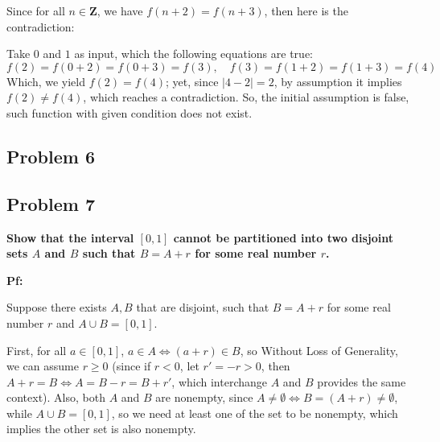 \documentclass{article}
\begin{document}
Since for all $n\in\mathbf{Z}$, we have $f(n+2)=f(n+3)$, then here is the contradiction: 

Take $0$ and $1$ as input, which the following equations are true:
$$f(2)=f(0+2)=f(0+3)=f(3),\quad f(3)=f(1+2)=f(1+3)=f(4)$$
Which, we yield $f(2)=f(4)$; yet, since $|4-2|=2$, by assumption it implies $f(2)\neq f(4)$, which reaches a contradiction. So, the initial assumption is false, such function with given condition does not exist.

\hfill

\subsection{Problem 6}

\hfill

\subsection{Problem 7}
\textbf{Show that the interval $[0, 1]$ cannot be partitioned into two disjoint sets $A$ and $B$ such that $B = A + r$ for some real number $r$.}

\textbf{Pf:}

Suppose there exists $A, B$ that are disjoint, such that $B=A+r$ for some real number $r$ and $A\cup B=[0,1]$.

First, for all $a\in[0,1]$, $a\in A \iff (a+r)\in B$, so Without Loss of Generality, we can assume $r \geq 0$ (since if $r<0$, let $r'=-r >0$, then $A+r=B \iff A=B-r = B+r'$, which interchange $A$ and $B$ provides the same context). Also, both $A$ and $B$ are nonempty, since $A\neq \emptyset \iff B=(A+r)\neq \emptyset$, while $A\cup B=[0,1]$, so we need at least one of the set to be nonempty, which implies the other set is also nonempty.
\end{document}
